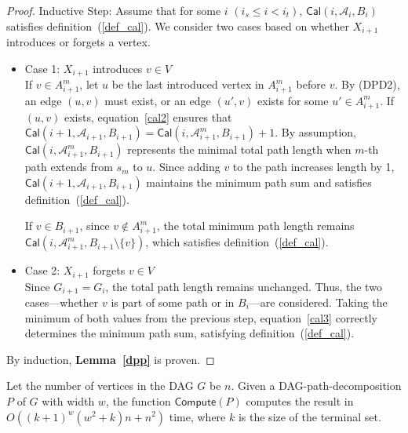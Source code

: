\documentclass[runningheads]{llncs}
\theoremstyle{plain}
\theoremstyle{definition}
\begin{document}
\begin{proof}
    Inductive Step: Assume that for some $i$ $(i_s \leq i < i_t)$, $\mathsf{Cal}(i, \mathscr{A}_i, B_i)$ satisfies definition~(\ref{def_cal}). We consider two cases based on whether $X_{i+1}$ introduces or forgets a vertex.

    \begin{itemize}
        \item Case 1: $X_{i+1}$ introduces $v \in V$
        \\
        If $v \in A^m_{i+1}$, let $u$ be the last introduced vertex in $A^m_{i+1}$ before $v$. By (DPD2), an edge $(u, v)$ must exist, or an edge $(u', v)$ exists for some $u' \in A^m_{i+1}$. If $(u, v)$ exists, equation~\ref{cal2} ensures that $\mathsf{Cal}(i+1, \mathscr{A}_{i+1}, B_{i+1}) = \mathsf{Cal}(i, \mathscr{A}^m_{i+1}, B_{i+1}) + 1$. By assumption, $\mathsf{Cal}(i, \mathscr{A}^m_{i+1}, B_{i+1})$ represents the minimal total path length when $m$-th path extends from $s_m$ to $u$. Since adding $v$ to the path increases length by 1, $\mathsf{Cal}(i+1, \mathscr{A}_{i+1}, B_{i+1})$ maintains the minimum path sum and satisfies definition~(\ref{def_cal}).
    
        If $v \in B_{i+1}$, since $v \notin A^m_{i+1}$, the total minimum path length remains $\mathsf{Cal}(i, \mathscr{A}^m_{i+1}, B_{i+1} \setminus \{v\})$, which satisfies definition~(\ref{def_cal}).
        
        \item Case 2: $X_{i+1}$ forgets $v \in V$
        \\
        Since $G_{i+1} = G_i$, the total path length remains unchanged. Thus, the two cases—whether $v$ is part of some path or in $B_i$—are considered. Taking the minimum of both values from the previous step, equation~\ref{cal3} correctly determines the minimum path sum, satisfying definition~(\ref{def_cal}).
    \end{itemize}
    By induction, \textbf{Lemma~\ref{dpp}} is proven.
\end{proof}


\begin{lemma}
    Let the number of vertices in the DAG $G$ be $n$. Given a DAG-path-decomposition $P$ of $G$ with width $w$, the function $\mathsf{Compute}(P)$ computes the result in $O((k+1)^w(w^2+k)n+n^2)$ time, where $k$ is the size of the terminal set.
\end{lemma}
\end{document}
